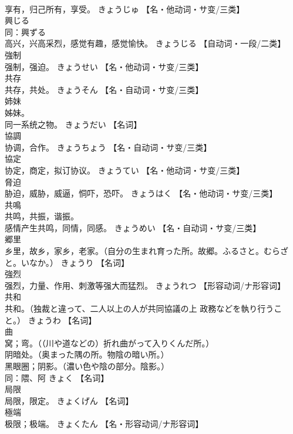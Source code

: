 \documentclass[8pt]{extreport}
\begin{document}
\begin{CJK}{UTF8}{min}
\\	享有，归己所有，享受。	きょうじゅ		【名・他动词・サ变/三类】
\\	興じる	
\\	同：興ずる 
\\	高兴，兴高采烈，感觉有趣，感觉愉快。	きょうじる		【自动词・一段/二类】
\\	強制	
\\	强制，强迫。	きょうせい		【名・他动词・サ变/三类】
\\	共存	
\\	共存，共处。	きょうそん		【名・自动词・サ变/三类】
\\	姉妹	
\\	姊妹。 
\\	同一系统之物。	きょうだい		【名词】
\\	協調	
\\	协调，合作。	きょうちょう		【名・自动词・サ变/三类】
\\	協定	
\\	协定，商定，拟订协议。	きょうてい		【名・他动词・サ变/三类】
\\	脅迫	
\\	胁迫，威胁，威逼，恫吓，恐吓。	きょうはく		【名・他动词・サ变/三类】
\\	共鳴	
\\	共鸣，共振，谐振。 
\\	感情产生共鸣，同情，同感。	きょうめい		【名・自动词・サ变/三类】
\\	郷里	
\\	乡里，故乡，家乡，老家。（自分の生まれ育った所。故郷。ふるさと。むらざと。いなか。）	きょうり		【名词】
\\	強烈	
\\	强烈，力量、作用、刺激等强大而猛烈。	きょうれつ		【形容动词/ナ形容词】
\\	共和	
\\	共和。（独裁と違って、二人以上の人が共同協議の上 政務などを執り行うこと。）	きょうわ		【名词】
\\	曲	
\\	窝；弯。（（川や道などの）折れ曲がって入りくんだ所。） 
\\	阴暗处。（奥まった隅の所。物陰の暗い所。） 
\\	黑眼圈；阴影。（濃い色や陰の部分。陰影。） 
\\	同：隈、阿	きょく		【名词】
\\	局限	
\\	局限，限定。	きょくげん		【名词】
\\	極端	
\\	极限；极端。	きょくたん		【名・形容动词/ナ形容词】

\end{CJK}
\end{document}
